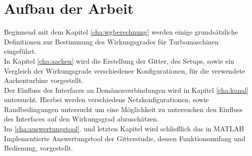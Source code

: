 \section{Aufbau der Arbeit}
Beginnend mit dem Kapitel \ref{cha:wgberechnung} werden einige grundsätzliche Definitionen zur Bestimmung des Wirkungsgrades für Turbomaschinen eingeführt.\\
In Kapitel \ref{cha:aachen} wird die Erstellung der Gitter, des Setups, sowie ein Vergleich der Wirkungsgrade verschiedener Konfigurationen, für die verwendete Aachenturbine vorgestellt.\\
Der Einfluss des Interfaces an Domänenverbindungen wird in Kapitel \ref{cha:kanal} untersucht. Hierbei werden verschiedene Netzkonfigurationen, sowie Randbedingungen untersucht um eine Möglichkeit zu untersuchen den Einfluss des Interfaces auf den Wirkungsgrad abzuschätzen.\\
Im \ref{cha:auswertungstool}. und letzten Kapitel wird schließlich das in MATLAB Implementierte Auswertungstool der Gitterstudie, dessen Funktionsumfang und Bedienung, vorgestellt. 